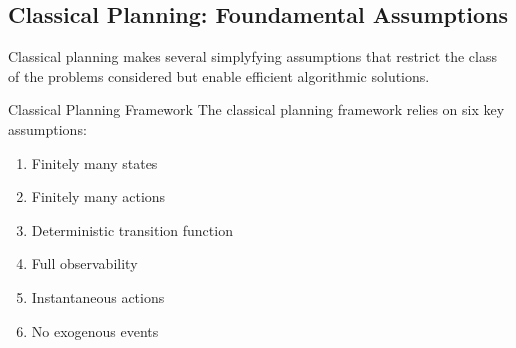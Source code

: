 \documentclass[a4paper]{article}
\theoremstyle{definition}
\begin{document}
\subsection{Classical Planning: Foundamental Assumptions}
Classical planning makes several simplyfying assumptions that restrict the class of the problems
considered but enable efficient algorithmic solutions.
\begin{definition}{Classical Planning Framework}
The classical planning framework relies on six key assumptions:
\begin{enumerate}
    \item Finitely many states
    \item Finitely many actions
    \item Deterministic transition function
    \item Full observability
    \item Instantaneous actions
    \item No exogenous events
\end{enumerate}
\end{definition}
\end{document}
